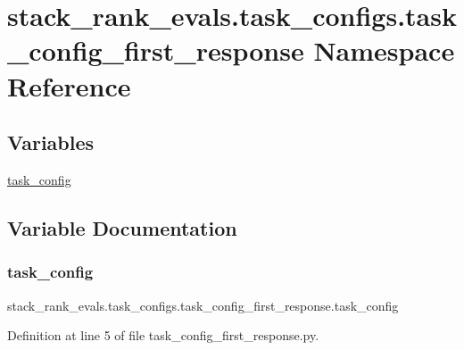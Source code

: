 \hypertarget{namespacestack__rank__evals_1_1task__configs_1_1task__config__first__response}{}\section{stack\+\_\+rank\+\_\+evals.\+task\+\_\+configs.\+task\+\_\+config\+\_\+first\+\_\+response Namespace Reference}
\label{namespacestack__rank__evals_1_1task__configs_1_1task__config__first__response}
\subsection*{Variables}
\begin{DoxyCompactItemize}
\item 
\hyperlink{namespacestack__rank__evals_1_1task__configs_1_1task__config__first__response_a2d4ec8eb29d9b55c1e211687b5f36d71}{task\+\_\+config}
\end{DoxyCompactItemize}


\subsection{Variable Documentation}
\mbox{\label{namespacestack__rank__evals_1_1task__configs_1_1task__config__first__response_a2d4ec8eb29d9b55c1e211687b5f36d71}} 
\subsubsection{\texorpdfstring{task\+\_\+config}{task\_config}}
{\footnotesize\ttfamily stack\+\_\+rank\+\_\+evals.\+task\+\_\+configs.\+task\+\_\+config\+\_\+first\+\_\+response.\+task\+\_\+config}



Definition at line 5 of file task\+\_\+config\+\_\+first\+\_\+response.\+py.

